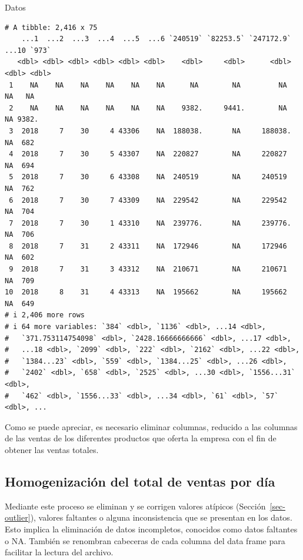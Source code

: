 \documentclass[
  us-letterpaper,
]{scrreprt}
\newenvironment{Shaded}{\begin{snugshade}}{\end{snugshade}}
\newcommand{\NormalTok}[1]{\textcolor[rgb]{0.00,0.23,0.31}{#1}}
\theoremstyle{plain}
\theoremstyle{plain}
\theoremstyle{definition}
\theoremstyle{remark}
\begin{document}
\begin{Shaded}
\begin{Highlighting}[]
\NormalTok{Datos}
\end{Highlighting}
\end{Shaded}

\begin{verbatim}
# A tibble: 2,416 x 75
    ...1  ...2  ...3  ...4  ...5  ...6 `240519` `82253.5` `247172.9` ...10 `973`
   <dbl> <dbl> <dbl> <dbl> <dbl> <dbl>    <dbl>     <dbl>      <dbl> <dbl> <dbl>
 1    NA    NA    NA    NA    NA    NA      NA        NA         NA     NA   NA 
 2    NA    NA    NA    NA    NA    NA    9382.     9441.        NA     NA 9382.
 3  2018     7    30     4 43306    NA  188038.       NA     188038.    NA  682 
 4  2018     7    30     5 43307    NA  220827        NA     220827     NA  694 
 5  2018     7    30     6 43308    NA  240519        NA     240519     NA  762 
 6  2018     7    30     7 43309    NA  229542        NA     229542     NA  704 
 7  2018     7    30     1 43310    NA  239776.       NA     239776.    NA  706 
 8  2018     7    31     2 43311    NA  172946        NA     172946     NA  602 
 9  2018     7    31     3 43312    NA  210671        NA     210671     NA  709 
10  2018     8    31     4 43313    NA  195662        NA     195662     NA  649 
# i 2,406 more rows
# i 64 more variables: `384` <dbl>, `1136` <dbl>, ...14 <dbl>,
#   `371.753114754098` <dbl>, `2428.16666666666` <dbl>, ...17 <dbl>,
#   ...18 <dbl>, `2099` <dbl>, `222` <dbl>, `2162` <dbl>, ...22 <dbl>,
#   `1384...23` <dbl>, `559` <dbl>, `1384...25` <dbl>, ...26 <dbl>,
#   `2402` <dbl>, `658` <dbl>, `2525` <dbl>, ...30 <dbl>, `1556...31` <dbl>,
#   `462` <dbl>, `1556...33` <dbl>, ...34 <dbl>, `61` <dbl>, `57` <dbl>, ...
\end{verbatim}

Como se puede apreciar, es necesario eliminar columnas, reducido a las
columnas de las ventas de los diferentes productos que oferta la empresa
con el fin de obtener las ventas totales.

\subsection{Homogenización del total de ventas por
día}\label{homogenizaciuxf3n-del-total-de-ventas-por-duxeda}

Mediante este proceso se eliminan y se corrigen valores atípicos
(Sección~\ref{sec-outlier}), valores faltantes o alguna inconsistencia
que se presentan en los datos. Esto implica la eliminación de datos
incompletos, conocidos como datos faltantes o NA. También se renombran
cabeceras de cada columna del data frame para facilitar la lectura del
archivo.
\end{document}
